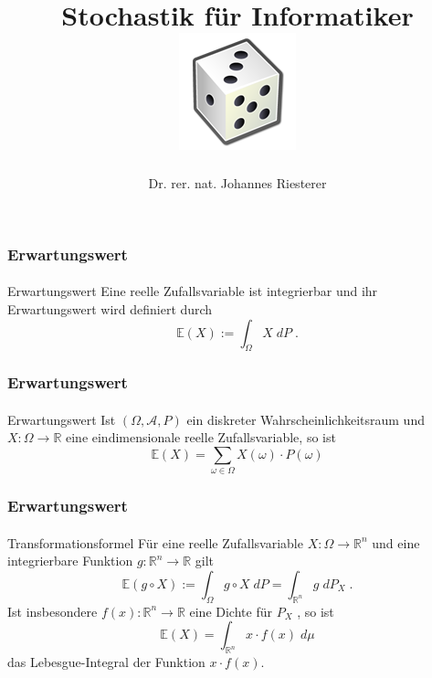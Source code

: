 \documentclass{beamer}
\begin{document}
\title[Stochastik] %
{Stochastik für Informatiker
\\
\includegraphics[scale=0.5]{img/craps}
}
\subtitle{}
\author[Dr. Johannes Riesterer] %
{Dr.  rer. nat. Johannes Riesterer}

\date[KPT 2004] %
{}

\subject{Stochastik}


\frame{\titlepage}





\begin{frame}
    \frametitle{Erwartungswert}
\framesubtitle{}
\begin{block}{Erwartungswert}
Eine reelle Zufallsvariable ist integrierbar und ihr Erwartungswert wird definiert durch
$$ \mathbb{E} (X) := \int_{\Omega} X \; dP \; .$$
\end{block}
 \end{frame}


\begin{frame}
    \frametitle{Erwartungswert}
\framesubtitle{}
\begin{block}{Erwartungswert}
Ist $(\Omega, \mathcal{A}, P)$ ein diskreter Wahrscheinlichkeitsraum und $X :\Omega \to \mathbb{R}$ eine eindimensionale reelle Zufallsvariable, so ist
$$ \mathbb{E} (X) = \sum_{\omega \in \Omega}  X(\omega) \cdot P(\omega)$$
\end{block}
 \end{frame}


\begin{frame}
    \frametitle{Erwartungswert}
\framesubtitle{}
\begin{block}{Transformationsformel}
Für eine reelle Zufallsvariable $X: \Omega \to \mathbb{R}^n$ und eine integrierbare Funktion $g:  \mathbb{R}^n \to \mathbb{R}$ gilt
$$ \mathbb{E} (g \circ X) := \int_{\Omega} g \circ X \; dP = \int_{\mathbb{R}^n}  g \; dP_X \;. $$
Ist insbesondere $f(x) : \mathbb{R}^n \to \mathbb{R}$ eine Dichte für $P_X$ , so ist  
$$\mathbb{E} (X) =  \int_{\mathbb{R}^n} x \cdot f(x) \; d\mu$$ das Lebesgue-Integral der Funktion $x \cdot f(x)$.
\end{block}
 \end{frame}
\end{document}
